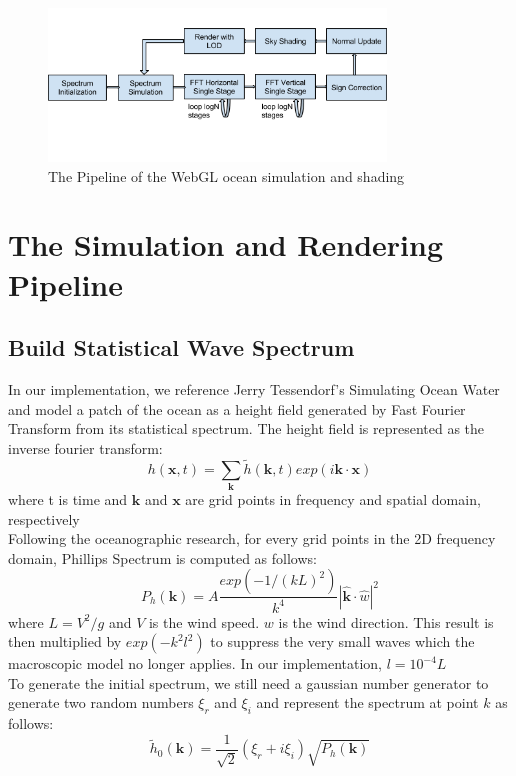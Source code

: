 \documentclass{jcgt}
\begin{document}
\begin{figure}[htb]
  \centering
   \includegraphics[width=0.8\textwidth]{pipeline.png}
   \caption{\label{fig:pipeline}
     The Pipeline of the WebGL ocean simulation and shading}
\end{figure}

\section{The Simulation and Rendering Pipeline}
\subsection{Build Statistical Wave Spectrum}
In our implementation, we reference Jerry Tessendorf's Simulating Ocean Water and model a patch of the ocean as a height field generated by Fast Fourier Transform from its statistical spectrum. The height field is represented as the inverse fourier transform:
\begin{equation}
h(\mathbf{x},t)=\sum_{\mathbf{k}} \tilde{h} (\mathbf{k},t) exp(i \mathbf{k} \cdot \mathbf{x})
\end{equation}
where t is time and $\mathbf{k}$ and $\mathbf{x}$ are grid points in frequency and spatial domain, respectively\\

Following the oceanographic research, for every grid points in the 2D frequency domain, Phillips Spectrum is computed as follows:
\begin{equation}
P_h (\mathbf{k})=A\frac{exp(-1/(kL)^2)}{k^4}|\hat{\mathbf{k}}\cdot\hat{w}| ^2
\end{equation}
where $L=V^2 /g$ and $V$ is the wind speed. $w$ is the wind direction. This result is then multiplied by $exp(-k^{2} l^{2})$ to suppress the very small waves which the macroscopic model no longer applies. In our implementation, $l=10^{-4}L$ \\

To generate the initial spectrum, we still need a gaussian number generator to generate two random numbers $\xi _r$ and $\xi _i$ and represent the spectrum at point $k$ as follows:
\begin{equation}
\tilde{h}_0 (\mathbf{k})=\frac{1}{\sqrt{2}}(\xi _r +i\xi _i )\sqrt{P_h  (\mathbf{k})}
\end{equation}
\end{document}
